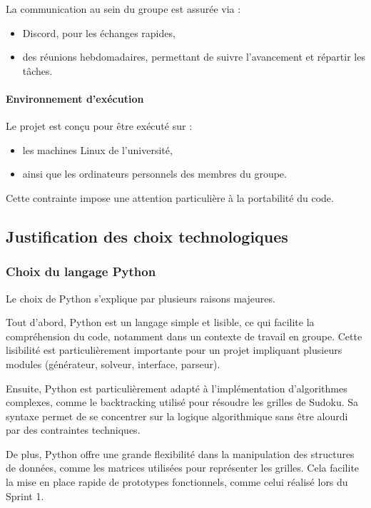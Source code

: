 \documentclass[a4paper]{article}
\begin{document}
La communication au sein du groupe est assurée via :
\begin{itemize}
    \item Discord, pour les échanges rapides,
    \item des réunions hebdomadaires, permettant de suivre l’avancement et répartir les tâches.
\end{itemize}

\paragraph{Environnement d’exécution}

Le projet est conçu pour être exécuté sur :
\begin{itemize}
    \item les machines Linux de l’université,
    \item ainsi que les ordinateurs personnels des membres du groupe.
\end{itemize}

Cette contrainte impose une attention particulière à la portabilité du code.

\subsection{Justification des choix technologiques}

\subsubsection{Choix du langage Python}

Le choix de Python s’explique par plusieurs raisons majeures.

Tout d’abord, Python est un langage simple et lisible, ce qui facilite la compréhension du code, notamment dans un contexte de travail en groupe. Cette lisibilité est particulièrement importante pour un projet impliquant plusieurs modules (générateur, solveur, interface, parseur).

Ensuite, Python est particulièrement adapté à l’implémentation d’algorithmes complexes, comme le backtracking utilisé pour résoudre les grilles de Sudoku. Sa syntaxe permet de se concentrer sur la logique algorithmique sans être alourdi par des contraintes techniques.

De plus, Python offre une grande flexibilité dans la manipulation des structures de données, comme les matrices utilisées pour représenter les grilles. Cela facilite la mise en place rapide de prototypes fonctionnels, comme celui réalisé lors du Sprint 1.
\end{document}
